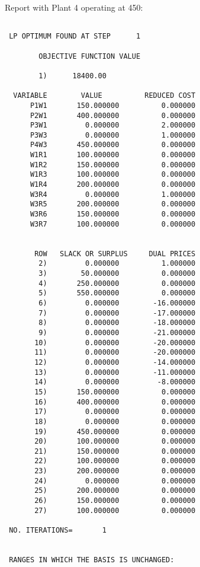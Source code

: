 \documentclass[12pt]{report}
\begin{document}
Report with Plant 4 operating at 450:\\
\begin{verbatim}

 LP OPTIMUM FOUND AT STEP      1

        OBJECTIVE FUNCTION VALUE

        1)      18400.00

  VARIABLE        VALUE          REDUCED COST
      P1W1       150.000000          0.000000
      P2W1       400.000000          0.000000
      P3W1         0.000000          2.000000
      P3W3         0.000000          1.000000
      P4W3       450.000000          0.000000
      W1R1       100.000000          0.000000
      W1R2       150.000000          0.000000
      W1R3       100.000000          0.000000
      W1R4       200.000000          0.000000
      W3R4         0.000000          1.000000
      W3R5       200.000000          0.000000
      W3R6       150.000000          0.000000
      W3R7       100.000000          0.000000


       ROW   SLACK OR SURPLUS     DUAL PRICES
        2)         0.000000          1.000000
        3)        50.000000          0.000000
        4)       250.000000          0.000000
        5)       550.000000          0.000000
        6)         0.000000        -16.000000
        7)         0.000000        -17.000000
        8)         0.000000        -18.000000
        9)         0.000000        -21.000000
       10)         0.000000        -20.000000
       11)         0.000000        -20.000000
       12)         0.000000        -14.000000
       13)         0.000000        -11.000000
       14)         0.000000         -8.000000
       15)       150.000000          0.000000
       16)       400.000000          0.000000
       17)         0.000000          0.000000
       18)         0.000000          0.000000
       19)       450.000000          0.000000
       20)       100.000000          0.000000
       21)       150.000000          0.000000
       22)       100.000000          0.000000
       23)       200.000000          0.000000
       24)         0.000000          0.000000
       25)       200.000000          0.000000
       26)       150.000000          0.000000
       27)       100.000000          0.000000

 NO. ITERATIONS=       1


 RANGES IN WHICH THE BASIS IS UNCHANGED:


\end{verbatim}
\end{document}
